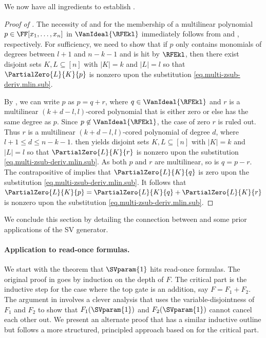 \documentclass{toc}
\begin{document}
We now have all ingredients to establish 
. 

\begin{proof}[Proof of ]
The necessity of  and  for the membership of a 
 multilinear polynomial $p \in \FF[x_1,\dots,x_n]$ in $\VanIdeal{\RFEkl}$ immediately follows from  and , respectively. For sufficiency, we need to show that if $p$ only contains monomials of degrees between $l+1$ and $n-k-1$ and is hit by $\RFEkl$, then there exist disjoint sets \(K,L\subseteq [n]\) with \(|K|=k\) and \(|L|=l\) so that \(\PartialZero{L}{K}{p}\) is nonzero upon the substitution \eqref{eq.multi-zsub-deriv.mlin.sub}.
 
 By , we can write $p$ as $p=q+r$, where $q \in \VanIdeal{\RFEkl}$ and $r$ is a multilinear \((k+d-l,l)\)-cored polynomial that is either zero or else has the same degree as $p$. Since $p \not\in \VanIdeal{\RFEkl}$, the case of zero $r$ is ruled out. Thus $r$ is a multilinear \((k+d-l,l)\)-cored polynomial of degree $d$, where $l+1 \le d \le n-k-1$.  then yields disjoint sets \(K,L\subseteq [n]\) with \(|K|=k\) and \(|L|=l\) so that \(\PartialZero{L}{K}{r}\) is nonzero upon the substitution \eqref{eq.multi-zsub-deriv.mlin.sub}. As both $p$ and $r$ are multilinear, so is $q = p-r$. The contrapositive of  implies that \(\PartialZero{L}{K}{q}\) is zero upon the substitution \eqref{eq.multi-zsub-deriv.mlin.sub}. It follows that \(\PartialZero{L}{K}{p} = \PartialZero{L}{K}{q} + \PartialZero{L}{K}{r}\) is nonzero upon the substitution \eqref{eq.multi-zsub-deriv.mlin.sub}.
\end{proof}


We conclude this section by detailing the connection between
 and some prior applications of the SV generator.

\paragraph{Application to read-once formulas.}
We start with the theorem that \(\SVparam{1}\) hits read-once formulas.
The original proof in \cite{MinahanVolkovich2017} goes by induction on the
depth of $F$. The critical part is the inductive step for the case where the top gate is an addition, say $F = F_1 + F_2$. The argument in \cite{MinahanVolkovich2017} involves a clever analysis that uses the variable-disjointness of $F_1$ and $F_2$ to show that $F_1(\SVparam{1})$ and $F_2(\SVparam{1})$ cannot cancel each other out. We present an alternate proof that has a similar inductive outline but follows a more structured, principled approach based on  for the critical part.
\end{document}
